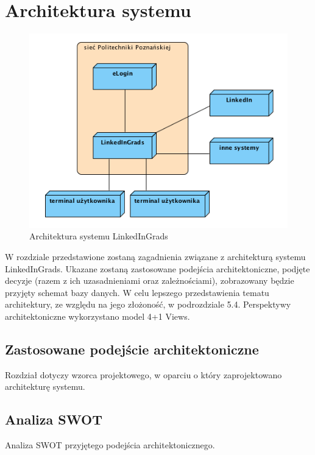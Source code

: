 \chapter{Architektura systemu}
\label{Chapter5}

\begin{figure}[H] 
\centering\includegraphics[width=15cm]{figures/image2}
\caption{Architektura systemu LinkedInGrads}\label{rys:use-case-diagram}
\end{figure}

W rozdziale przedstawione zostaną zagadnienia związane z architekturą systemu LinkedInGrads. Ukazane zostaną zastosowane podejścia architektoniczne, podjęte decyzje (razem z ich uzasadnieniami oraz zależnościami), zobrazowany będzie przyjęty schemat bazy danych. W celu lepszego przedstawienia tematu architektury, ze względu na jego złożoność, w podrozdziale 5.4. Perspektywy architektoniczne wykorzystano model 4+1 Views.

\section{Zastosowane podejście architektoniczne}
\label{Chapter52}

Rozdział dotyczy wzorca projektowego, w oparciu o który zaprojektowano architekturę systemu.

\section{Analiza SWOT}
\label{Chapter53}

Analiza SWOT przyjętego podejścia architektonicznego.


